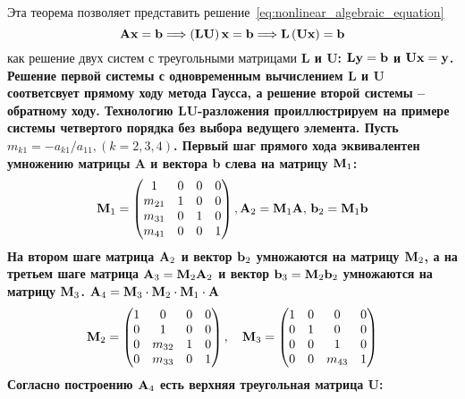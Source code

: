 Эта теорема позволяет представить решение~\eqref{eq:nonlinear_algebraic_equation}
\begin{equation*}
    \bf{A}\bf{x} = \bf{b} \Longrightarrow \left( \bf{L}\bf{U} \right)\bf{x} = \bf{b} \Longrightarrow \bf{L}\left( \bf{U}\bf{x} \right) = \bf{b}
\end{equation*}
как решение двух систем с треугольными матрицами \bf{L} и \bf{U}: $\bf{L}\bf{y} = \bf{b}$ и $\bf{U}\bf{x} = \bf{y}$.
Решение первой системы с одновременным вычислением \bf{L} и \bf{U} соответсвует прямому ходу метода Гаусса, а решение
второй системы -- обратному ходу. Технологию \bf{LU}-разложения проиллюстрируем на примере системы четвертого
порядка без выбора ведущего элемента. Пусть $\displaystyle m_{k1} = -a_{k1}/a_{11}, (k = 2, 3, 4)$. Первый шаг
прямого хода эквивалентен умножению матрицы \bf{A} и вектора \bf{b} слева на матрицу $\bf{M}_1$:
\begin{equation*}
    \bf{M}_1 =
    \begin{pmatrix}
        1      & 0 & 0 & 0 \\
        m_{21} & 1 & 0 & 0 \\
        m_{31} & 0 & 1 & 0 \\
        m_{41} & 0 & 0 & 1
    \end{pmatrix},
    \bf{A}_2 = \bf{M}_1 \bf{A}, \, \bf{b}_2 = \bf{M}_1 \bf{b}
\end{equation*}
На втором шаге матрица $\bf{A}_2$ и вектор $\bf{b}_2$ умножаются на матрицу $\bf{M}_2$, а на третьем шаге матрица
$\bf{A}_3 = \bf{M}_2 \bf{A}_2$ и вектор $\bf{b}_3 = \bf{M}_2 \bf{b}_2 $ умножаются на матрицу $\bf{M}_3$.
$\bf{A}_4 = \bf{M}_3 \cdot \bf{M}_2 \cdot \bf{M}_1 \cdot \bf{A}$
\begin{equation*}
    \bf{M}_2 =
    \begin{pmatrix}
        1 & 0      & 0 & 0 \\
        0 & 1      & 0 & 0 \\
        0 & m_{32} & 1 & 0 \\
        0 & m_{33} & 0 & 1
    \end{pmatrix},
    \quad \bf{M}_3 =
    \begin{pmatrix}
        1 & 0 & 0      & 0 \\
        0 & 1 & 0      & 0 \\
        0 & 0 & 1      & 0 \\
        0 & 0 & m_{43} & 1
    \end{pmatrix}
\end{equation*}
Согласно построению $\bf{A}_4$ есть верхняя треугольная матрица \bf{U}:
